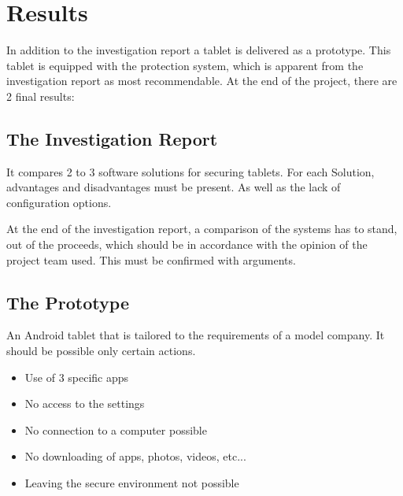 \section*{Results}
In addition to the investigation report a tablet is delivered as a prototype. This tablet is equipped with the protection system, which is apparent from the investigation report as most recommendable.
\newline At the end of the project, there are 2 final results:
\subsection*{The Investigation Report}
It compares 2 to 3 software solutions for securing tablets. For each Solution, advantages and disadvantages must be present. As well as the lack of configuration options.

At the end of the investigation report, a comparison of the systems has to stand, out of the proceeds, which should be in accordance with the opinion of the project team used. This must be confirmed with arguments.
\newpage
\subsection*{The Prototype}
An Android tablet that is tailored to the requirements of a model company. It should be possible only certain actions.
\begin{itemize}
	\item Use of 3 specific apps
	\item No access to the settings
	\item No connection to a computer possible
	\item No downloading of apps, photos, videos, etc...
	\item Leaving the secure environment not possible
\end{itemize}
